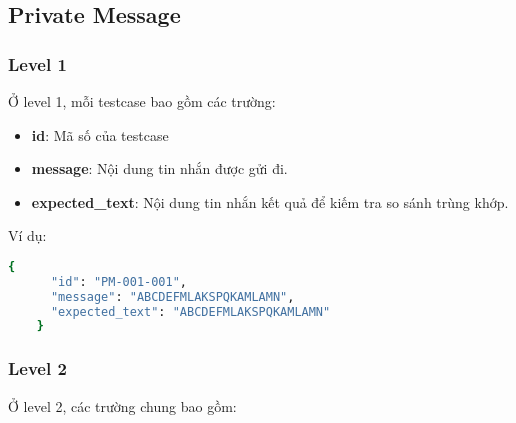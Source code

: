 \subsection{Private Message}
\subsubsection{Level 1}
Ở level 1, mỗi testcase bao gồm các trường:
\begin{itemize}
    \item \textbf{id}: Mã số của testcase
    \item \textbf{message}: Nội dung tin nhắn được gửi đi.
    \item \textbf{expected\_text}: Nội dung tin nhắn kết quả để kiếm tra so sánh trùng khớp.
\end{itemize}

\noindent Ví dụ:
\begin{lstlisting}[language=bash, caption={Ví dụ testcase PM-001-0001 ở level 1}, breaklines=true]
    {
      "id": "PM-001-001",
      "message": "ABCDEFMLAKSPQKAMLAMN",
      "expected_text": "ABCDEFMLAKSPQKAMLAMN"
    }
\end{lstlisting}

\subsubsection{Level 2}
Ở level 2, các trường chung bao gồm:

